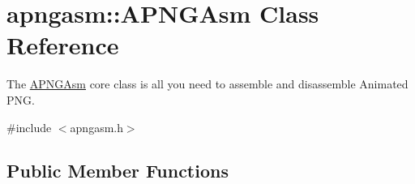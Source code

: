 \hypertarget{classapngasm_1_1APNGAsm}{\section{apngasm\-:\-:A\-P\-N\-G\-Asm Class Reference}
\label{classapngasm_1_1APNGAsm}
}


The \hyperlink{classapngasm_1_1APNGAsm}{A\-P\-N\-G\-Asm} core class is all you need to assemble and disassemble Animated P\-N\-G.  




{\ttfamily \#include $<$apngasm.\-h$>$}

\subsection*{Public Member Functions}
